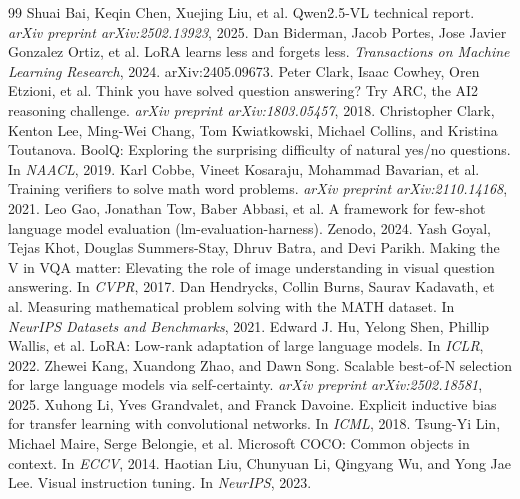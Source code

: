 \documentclass{article}
\begin{document}
\begin{thebibliography}{99}\small
{} Shuai Bai, Keqin Chen, Xuejing Liu, et al. Qwen2.5-VL technical report. \emph{arXiv preprint arXiv:2502.13923}, 2025.
 Dan Biderman, Jacob Portes, Jose Javier Gonzalez Ortiz, et al. LoRA learns less and forgets less. \emph{Transactions on Machine Learning Research}, 2024. arXiv:2405.09673.
 Peter Clark, Isaac Cowhey, Oren Etzioni, et al. Think you have solved question answering? Try ARC, the AI2 reasoning challenge. \emph{arXiv preprint arXiv:1803.05457}, 2018.
 Christopher Clark, Kenton Lee, Ming-Wei Chang, Tom Kwiatkowski, Michael Collins, and Kristina Toutanova. BoolQ: Exploring the surprising difficulty of natural yes/no questions. In \emph{NAACL}, 2019.
 Karl Cobbe, Vineet Kosaraju, Mohammad Bavarian, et al. Training verifiers to solve math word problems. \emph{arXiv preprint arXiv:2110.14168}, 2021.
 Leo Gao, Jonathan Tow, Baber Abbasi, et al. A framework for few-shot language model evaluation (lm-evaluation-harness). Zenodo, 2024.
 Yash Goyal, Tejas Khot, Douglas Summers-Stay, Dhruv Batra, and Devi Parikh. Making the V in VQA matter: Elevating the role of image understanding in visual question answering. In \emph{CVPR}, 2017.
 Dan Hendrycks, Collin Burns, Saurav Kadavath, et al. Measuring mathematical problem solving with the MATH dataset. In \emph{NeurIPS Datasets and Benchmarks}, 2021.
 Edward J. Hu, Yelong Shen, Phillip Wallis, et al. LoRA: Low-rank adaptation of large language models. In \emph{ICLR}, 2022.
 Zhewei Kang, Xuandong Zhao, and Dawn Song. Scalable best-of-N selection for large language models via self-certainty. \emph{arXiv preprint arXiv:2502.18581}, 2025.
 Xuhong Li, Yves Grandvalet, and Franck Davoine. Explicit inductive bias for transfer learning with convolutional networks. In \emph{ICML}, 2018.
 Tsung-Yi Lin, Michael Maire, Serge Belongie, et al. Microsoft COCO: Common objects in context. In \emph{ECCV}, 2014.
 Haotian Liu, Chunyuan Li, Qingyang Wu, and Yong Jae Lee. Visual instruction tuning. In \emph{NeurIPS}, 2023.

\end{thebibliography}
\end{document}
